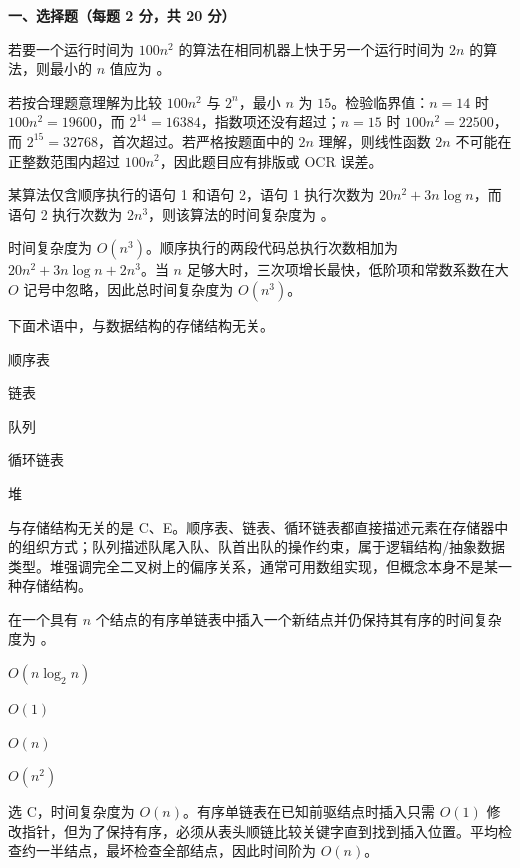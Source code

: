

\textbf{一、选择题（每题 2 分，共 20 分）}

\begin{question}
若要一个运行时间为 $100n^2$ 的算法在相同机器上快于另一个运行时间为 $2n$ 的算法，则最小的 $n$ 值应为 \blank。
\begin{solution}
若按合理题意理解为比较 $100n^2$ 与 $2^n$，最小 $n$ 为 $15$。检验临界值：$n=14$ 时 $100n^2=19600$，而 $2^{14}=16384$，指数项还没有超过；$n=15$ 时 $100n^2=22500$，而 $2^{15}=32768$，首次超过。若严格按题面中的 $2n$ 理解，则线性函数 $2n$ 不可能在正整数范围内超过 $100n^2$，因此题目应有排版或 OCR 误差。
\end{solution}
\end{question}

\begin{question}
某算法仅含顺序执行的语句 1 和语句 2，语句 1 执行次数为 $20n^2+3n\log n$，而语句 2 执行次数为 $2n^3$，则该算法的时间复杂度为 \blank。
\begin{solution}
时间复杂度为 $O(n^3)$。顺序执行的两段代码总执行次数相加为 $20n^2+3n\log n+2n^3$。当 $n$ 足够大时，三次项增长最快，低阶项和常数系数在大 $O$ 记号中忽略，因此总时间复杂度为 $O(n^3)$。
\end{solution}
\end{question}

\begin{question}
下面术语中，\blank 与数据结构的存储结构无关。
\begin{choiceoptions}[5]
  \item 顺序表
  \item 链表
  \item 队列
  \item 循环链表
  \item 堆
\end{choiceoptions}
\begin{solution}
与存储结构无关的是 C、E。顺序表、链表、循环链表都直接描述元素在存储器中的组织方式；队列描述队尾入队、队首出队的操作约束，属于逻辑结构/抽象数据类型。堆强调完全二叉树上的偏序关系，通常可用数组实现，但概念本身不是某一种存储结构。
\end{solution}
\end{question}

\begin{question}
在一个具有 $n$ 个结点的有序单链表中插入一个新结点并仍保持其有序的时间复杂度为 \blank。
\begin{choiceoptions}[2]
  \item $O(n\log_2 n)$
  \item $O(1)$
  \item $O(n)$
  \item $O(n^2)$
\end{choiceoptions}
\begin{solution}
选 C，时间复杂度为 $O(n)$。有序单链表在已知前驱结点时插入只需 $O(1)$ 修改指针，但为了保持有序，必须从表头顺链比较关键字直到找到插入位置。平均检查约一半结点，最坏检查全部结点，因此时间阶为 $O(n)$。
\end{solution}
\end{question}

